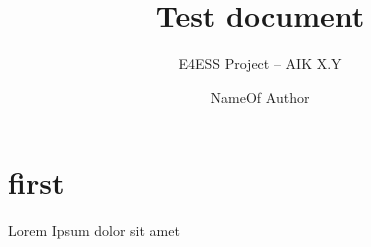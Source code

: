 \documentclass[]{e4esslayout}
\title{%
	Test document
}
\subtitle{%
	E4ESS Project -- AIK X.Y
}
\author{%
	NameOf Author
}
\begin{document}
\raggedbottom



\chapter{first}

Lorem Ipsum dolor sit amet
\end{document}
